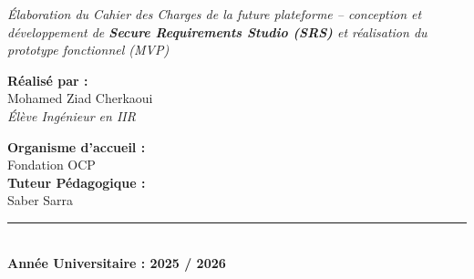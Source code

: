 \documentclass[12pt,a4paper,oneside]{report}
\begin{document}
\begin{titlepage}
\begin{center}
    {\large\itshape\color{emsiblue} Élaboration du Cahier des Charges de la future plateforme -- conception et développement de \textbf{Secure Requirements Studio (SRS)} et réalisation du prototype fonctionnel (MVP)}

    \vspace{0.6cm}


    \vspace{0.7cm}

    \noindent
    \begin{minipage}[t]{0.48\textwidth}
        \begin{flushleft} \normalsize
            \textbf{\color{focpgreendark}Réalisé par :}\\[2pt]
            Mohamed Ziad Cherkaoui\\[1pt]
            {\footnotesize\itshape Élève Ingénieur en IIR}
        \end{flushleft}
    \end{minipage}%
    \begin{minipage}[t]{0.48\textwidth}
        \begin{flushright} \normalsize
            \textbf{\color{focpgreendark}Organisme d'accueil :}\\
            Fondation OCP\\[4pt]
            \textbf{\color{focpgreendark}Tuteur Pédagogique :}\\
            Saber Sarra
        \end{flushright}
    \end{minipage}

    \vfill
    {\color{focpgreen}\rule{\textwidth}{0.8pt}}\\[4pt]
    {\large\bfseries\color{emsiblue} Année Universitaire : 2025 / 2026}
\end{center}
\end{titlepage}
\end{document}
